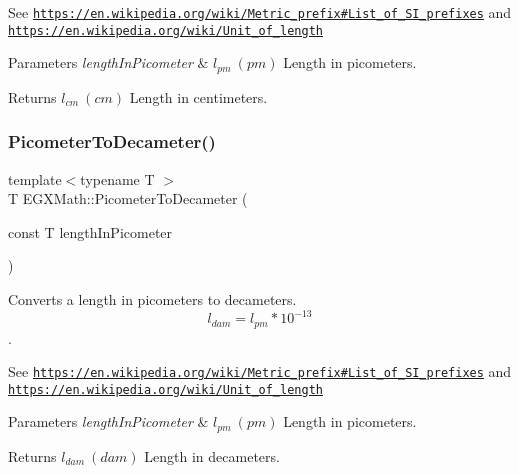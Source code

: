 See \href{https://en.wikipedia.org/wiki/Metric_prefix#List_of_SI_prefixes}{\tt https\+://en.\+wikipedia.\+org/wiki/\+Metric\+\_\+prefix\#\+List\+\_\+of\+\_\+\+S\+I\+\_\+prefixes} and \href{https://en.wikipedia.org/wiki/Unit_of_length}{\tt https\+://en.\+wikipedia.\+org/wiki/\+Unit\+\_\+of\+\_\+length} 
\begin{DoxyParams}{Parameters}
{\em length\+In\+Picometer} & $ l_{pm}\ (pm)$ Length in picometers. \\
\hline
\end{DoxyParams}
\begin{DoxyReturn}{Returns}
$ l_{cm}\ (cm)$ Length in centimeters. 
\end{DoxyReturn}
\mbox{\label{group___e_g_x_math-_conversions-_length_conversions-_s_i-_picometer-_s_i_gac3123f93cc73d11cefa26073dc2c46a5}} 
\subsubsection{\texorpdfstring{Picometer\+To\+Decameter()}{PicometerToDecameter()}}
{\footnotesize\ttfamily template$<$typename T $>$ \\
T E\+G\+X\+Math\+::\+Picometer\+To\+Decameter (\begin{DoxyParamCaption}\item[{const T}]{length\+In\+Picometer }\end{DoxyParamCaption})}



Converts a length in picometers to decameters. \[ l_{dam}=l_{pm} * 10^{-13} \]. 

See \href{https://en.wikipedia.org/wiki/Metric_prefix#List_of_SI_prefixes}{\tt https\+://en.\+wikipedia.\+org/wiki/\+Metric\+\_\+prefix\#\+List\+\_\+of\+\_\+\+S\+I\+\_\+prefixes} and \href{https://en.wikipedia.org/wiki/Unit_of_length}{\tt https\+://en.\+wikipedia.\+org/wiki/\+Unit\+\_\+of\+\_\+length} 
\begin{DoxyParams}{Parameters}
{\em length\+In\+Picometer} & $ l_{pm}\ (pm)$ Length in picometers. \\
\hline
\end{DoxyParams}
\begin{DoxyReturn}{Returns}
$ l_{dam}\ (dam)$ Length in decameters. 
\end{DoxyReturn}
\mbox{\label{group___e_g_x_math-_conversions-_length_conversions-_s_i-_picometer-_s_i_gab0d70362fb21996562efb9c22d9bacf4}} 
